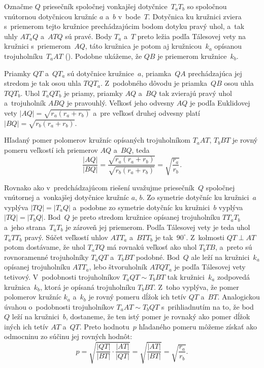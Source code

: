 {%
Označme $Q$ priesečník spoločnej vonkajšej dotyčnice~$T_aT_b$ so spoločnou vnútornou
dotyčnicou kružníc $a$ a~$b$ v~bode~$T$. Dotyčnica ku kružnici zviera s~priemerom
tejto kružnice prechádzajúcim bodom dotyku pravý uhol, a~tak uhly $AT_aQ$
a~$ATQ$ sú pravé. Body $T_a$ a~$T$ preto ležia podľa Tálesovej vety na
kružnici s~priemerom~$AQ$, táto kružnica je potom aj kružnicou~$k_a$
opísanou trojuholníku~$T_aAT$ (\obr). Podobne ukážeme, že $QB$ je priemerom
kružnice~$k_b$.
%

Priamky $QT$ a~$QT_a$ sú dotyčnice kružnice~$a$, priamka~$QA$ prechádzajúca
jej stredom je tak osou uhla $TQT_a$. Z~podobného dôvodu je priamka~$QB$ osou uhla $TQT_b$. Uhol $T_aQT_b$ je priamy, priamky $AQ$ a~$BQ$ tak
zvierajú pravý uhol a~trojuholník $ABQ$ je pravouhlý. Veľkosť jeho
odvesny $AQ$ je podľa Euklidovej vety $|AQ|=\sqrt{r_a(r_a+r_b)}$
a~pre veľkosť druhej odvesny platí $|BQ|=\sqrt{r_b(r_a+r_b)}$.

Hľadaný pomer polomerov kružníc opísaných trojuholníkom $T_aAT$, $T_bBT$
je rovný pomeru veľkostí ich priemerov $AQ$ a~$BQ$, teda
$$
\frac{|AQ|}{|BQ|}=\frac{\sqrt{r_a(r_a+r_b)}}{\sqrt{r_b(r_a+r_b)}}
=\sqrt{\frac{r_a}{r_b}}.
$$

\ineres
Rovnako ako v~predchádzajúcom riešení uvažujme priesečník~$Q$ spoločnej
vnútornej a~vonkajšej dotyčnice kružníc $a$, $b$. Zo symetrie dotyčníc ku kružnici~$a$ vyplýva $|TQ|=|T_aQ|$ a~podobne zo symetrie dotyčníc ku kružnici~$b$ vyplýva $|TQ|=|T_bQ|$. Bod~$Q$ je preto stredom kružnice opísanej trojuholníku
$TT_aT_b$ a~jeho strana~$T_aT_b$ je zároveň jej priemerom.
Podľa Tálesovej vety je teda uhol $T_aTT_b$ pravý. Súčet
veľkostí uhlov $ATT_a$ a~$BTT_b$ je tak~$90^\circ$.
Z~kolmosti $QT\perp AT$ potom dostávame, že uhol $T_aTQ$ má rovnakú veľkosť
ako uhol $T_bTB$, a~preto sú rovnoramenné trojuholníky $T_aQT$ a~$T_bBT$ podobné.
Bod~$Q$ ale leží na kružnici~$k_a$ opísanej trojuholníku $ATT_a$,
lebo štvoruholník $ATQT_a$ je podľa Tálesovej vety tetivový.
V~podobnosti trojuholníkov $T_aQT\sim T_bBT$ tak kružnici~$k_a$ zodpovedá kružnica~$k_b$,
ktorá je opísaná trojuholníku $T_bBT$.
Z~toho vyplýva, že pomer
polomerov kružníc $k_a$ a~$k_b$ je rovný pomeru dĺžok ich tetív $QT$ a~$BT$.
Analogickou úvahou
o~podobnosti trojuholníkov
$T_aAT\sim T_bQT$ s~prihliadnutím na to, že bod~$Q$ leží na kružnici~$b$,
dostaneme, že ten istý pomer je
rovnaký ako pomer dĺžok iných ich tetív $AT$ a~$QT$. Preto hodnotu~$p$ hľadaného pomeru môžeme získať ako odmocninu zo súčinu jej rovných
hodnôt:
$$
p=\sqrt{\frac{|QT|}{|BT|}\cdot\frac{|AT|}{|QT|}}=\sqrt{\frac{|AT|}{|BT|}}=
\sqrt{\frac{r_a}{r_b}}.
$$




}
